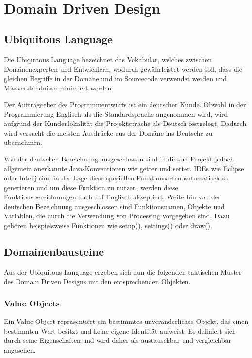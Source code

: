\chapter{Domain Driven Design}

\section{Ubiquitous Language}

Die Ubiquitous Language bezeichnet das Vokabular, welches zwischen Domänenexperten
und Entwicklern, wodurch gewährleistet werden soll, dass die gleichen Begriffe in der
Domäne und im Sourcecode verwendet werden und Missverständnisse minimiert werden.

Der Auftraggeber des Programmentwurfs ist ein deutscher Kunde. 
Obwohl in der Programmierung Englisch als die Standardsprache angenommen wird, wird aufgrund der Kundenlokalität die Projektsprache als \glqq Deutsch\grqq{} festgelegt. 
Dadurch wird versucht die meisten Ausdrücke aus der Domäne ins Deutsche zu übernehmen. 

Von der deutschen Bezeichnung ausgeschlossen sind in diesem Projekt jedoch allgemein anerkannte Java-Konventionen wie \glqq getter\grqq{} und \glqq{} setter\grqq{}. 
IDEs wie Eclipse oder Intelij sind in der Lage diese speziellen Funktionsarten automatisch zu generieren und um diese Funktion zu nutzen, werden diese Funktionsbezeichnungen auch auf Englisch akzeptiert. 
Weiterhin von der deutschen Bezeichnung ausgeschlossen sind Funktionsnamen, Objekte und Variablen, die durch die Verwendung von Processing vorgegeben sind. 
Dazu gehören beispielsweise Funktionen  wie \glqq setup(), settings()\grqq{} oder \glqq draw()\grqq{}.

\section{Domainenbausteine}

Aus der Ubiquitous Language ergeben sich nun die folgenden taktischen Muster des Domain
Driven Designs mit den entsprechenden Objekten.

\newpage

\subsection{Value Objects}

Ein Value Object repräsentiert ein bestimmtes unveränderliches Objekt, das einen bestimmten Wert besitzt und keine eigene Identität aufweist. 
Es definiert sich durch seine Eigenschaften und wird daher als austauschbar und vergleichbar angesehen.


